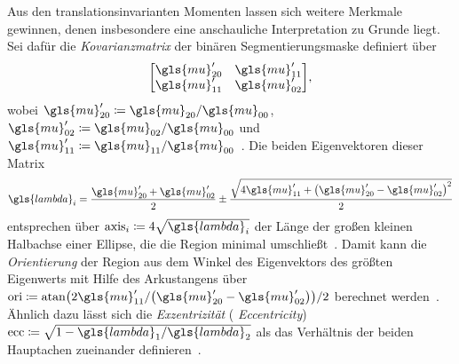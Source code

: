 Aus den translationsinvarianten Momenten lassen sich weitere Merkmale gewinnen, denen insbesondere eine anschauliche Interpretation zu Grunde liegt.
Sei dafür die \emph{Kovarianzmatrix} der binären Segmentierungsmaske definiert über
\begin{equation*}
  \begin{bmatrix}
    \gls{mu}^{\prime}_{20} & \gls{mu}^{\prime}_{11}\\
    \gls{mu}^{\prime}_{11} & \gls{mu}^{\prime}_{02}
  \end{bmatrix},
\end{equation*}
wobei $\gls{mu}^{\prime}_{20} \coloneqq \gls{mu}_{20}/\gls{mu}_{00}$, $\gls{mu}^{\prime}_{02} \coloneqq \gls{mu}_{02}/\gls{mu}_{00}$ und $\gls{mu}^{\prime}_{11} \coloneqq \gls{mu}_{11}/\gls{mu}_{00}$~\cite{momente}.
Die beiden Eigenvektoren dieser Matrix
\begin{equation*}
  \gls{lambda}_i = \frac{\gls{mu}^{\prime}_{20} + \gls{mu}^{\prime}_{02}}{2} \pm \frac{\sqrt{4\gls{mu}^{\prime}_{11} + {\left(\gls{mu}^{\prime}_{20} - \gls{mu}^{\prime}_{02}\right)}^2}}{2}
\end{equation*}
entsprechen über $\mathrm{axis}_i \coloneqq 4 \sqrt{\gls{lambda}_i}$ der Länge der großen \bzw{} kleinen Halbachse einer Ellipse, die die Region minimal umschließt~\cite{scikit, momente}.
Damit kann die \emph{Orientierung} der Region aus dem Winkel des Eigenvektors des größten Eigenwerts mit Hilfe des Arkustangens über $\mathrm{ori} \coloneqq \mathrm{atan}\left(2\gls{mu}^{\prime}_{11}/\left(\gls{mu}^{\prime}_{20} - \gls{mu}^{\prime}_{02}\right)\right)/2$ berechnet werden~\cite{scikit}.
Ähnlich dazu lässt sich die \emph{Exzentrizität} (\engl{} \emph{Eccentricity}) $\mathrm{ecc} \coloneqq \sqrt{1 - \gls{lambda}_1/\gls{lambda}_2}$ als das Verhältnis der beiden Hauptachen zueinander definieren~\cite{scikit, Siedhoff}.


